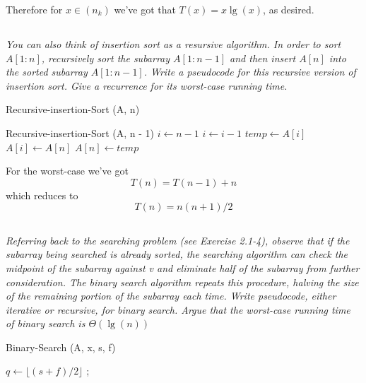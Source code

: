 \documentclass[11pt,oneside,titlepage]{book}
\begin{document}
Therefore for $x \in (n_k)$ we've got that $T(x) = x \lg(x)$, as desired.

\subsection{}

\textit{You can also think of insertion sort as a resursive algorithm. In order to sort
  $A[1:n]$, recursively sort the subarray $A[1:n - 1]$ and then insert $A[n]$ into the
  sorted subarray $A[1: n - 1]$. Write a pseudocode for this recursive version of insertion
  sort. Give a recurrence for its worst-case running time.}

\begin{function}
  \caption{Recursive-insertion-Sort (A, n)}
  Recursive-insertion-Sort (A, n - 1)\;
  $i \leftarrow n - 1$ \;
  {
    $i \leftarrow i - 1$
  }
  $temp \leftarrow A[i]$ \;
  $A[i] \leftarrow A[n]$ \;
  $A[n] \leftarrow temp$ \;
\end{function}

For the worst-case we've got
$$T(n) = T(n - 1) + n$$
which reduces to
$$T(n) = n(n + 1)/2$$


\subsection{}

\textit{Referring back to the searching problem (see Exercise 2.1-4), observe that if the
  subarray being searched is already sorted, the searching algorithm can check the
  midpoint of the subarray against v and eliminate half of the subarray from further
  consideration. The binary search algorithm repeats this procedure, halving the
  size of the remaining portion of the subarray each time. Write pseudocode, either
  iterative or recursive, for binary search. Argue that the worst-case running time of
  binary search is $\Theta(\lg(n))$}

\begin{function}
  \caption{Binary-Search (A, x, s, f)}
   {
    \;
  }
  $q \leftarrow \lfloor (s + f)/2\rfloor$\;
   {
    ;
  }{
    {
       \;
    }
    {
       \;
    }
  }
\end{function}
\end{document}
